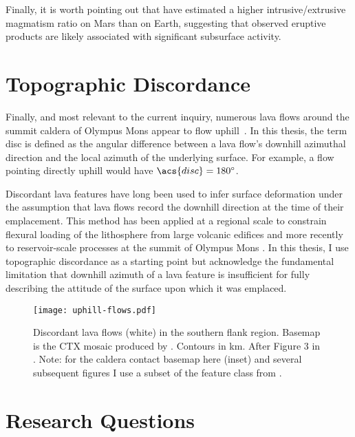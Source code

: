 Finally, it is worth pointing out that \textcite[][and others]{black_eruptibility_2016} have estimated a higher intrusive/extrusive magmatism ratio on Mars than on Earth, suggesting that observed eruptive products are likely associated with significant subsurface activity.

\section{Topographic Discordance}\label{sec:discordance}

Finally, and most relevant to the current inquiry, numerous lava flows around the summit caldera of Olympus Mons appear to flow uphill~\parencite[Figure~\ref{fig:uphill-flows}; after][]{mouginis-mark_late-stage_2019}. In this thesis, the term \ac{disc} is defined as the angular difference between a lava flow's downhill azimuthal direction and the local azimuth of the underlying surface. For example, a flow pointing directly uphill would have $\acs{disc}=\ang{180}$. 

Discordant lava features have long been used to infer surface deformation under the assumption that lava flows record the downhill direction at the time of their emplacement. This method has been applied at a regional scale to constrain flexural loading of the lithosphere from large volcanic edifices \parencite{mouginis-mark_ancient_1982,isherwood_volcanic_2013,chadwick_late_2015} and more recently to reservoir-scale processes at the summit of Olympus Mons \parencite{mouginis-mark_late-stage_2019}. In this thesis, I use topographic discordance as a starting point but acknowledge the fundamental limitation that downhill azimuth of a lava feature is insufficient for fully describing the attitude of the surface upon which it was emplaced.

\begin{figure}
    \centering
    \texttt{[image: uphill-flows.pdf]}
    \caption[Discordant lava flows]{Discordant lava flows (white) in the southern flank region. Basemap is the \acf{CTX} mosaic produced by \textcite{Dickson2018AGB}. Contours in \unit{\km}. After Figure 3 in \textcite{mouginis-mark_late-stage_2019}. Note: for the caldera contact basemap here (inset) and several subsequent figures I use a subset of the feature class from \textcite{mouginis-mark_geologic_2021}.}%
    \label{fig:uphill-flows}
\end{figure}

\section{Research Questions}

